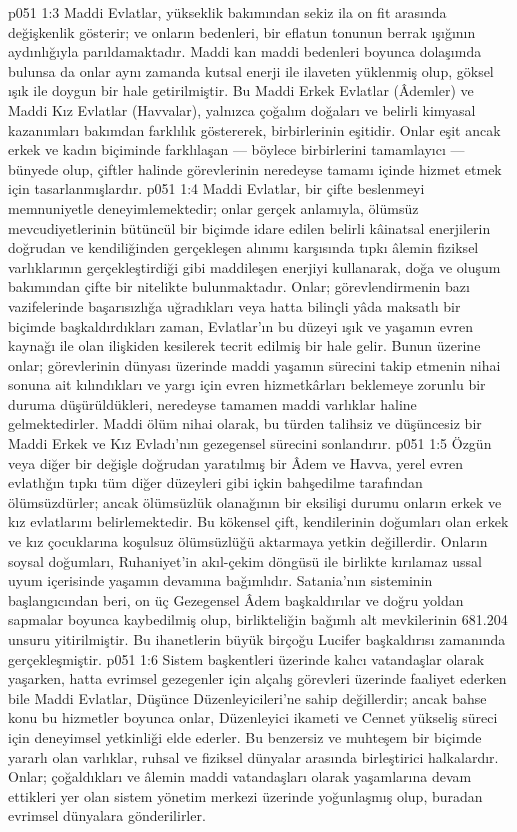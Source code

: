 \vs p051 1:3 Maddi Evlatlar, yükseklik bakımından sekiz ila on fit arasında değişkenlik gösterir; ve onların bedenleri, bir eflatun tonunun berrak ışığının aydınlığıyla parıldamaktadır. Maddi kan maddi bedenleri boyunca dolaşımda bulunsa da onlar aynı zamanda kutsal enerji ile ilaveten yüklenmiş olup, göksel ışık ile doygun bir hale getirilmiştir. Bu Maddi Erkek Evlatlar (Âdemler) ve Maddi Kız Evlatlar (Havvalar), yalnızca çoğalım doğaları ve belirli kimyasal kazanımları bakımdan farklılık göstererek, birbirlerinin eşitidir. Onlar eşit ancak erkek ve kadın biçiminde farklılaşan --- böylece birbirlerini tamamlayıcı --- bünyede olup, çiftler halinde görevlerinin neredeyse tamamı içinde hizmet etmek için tasarlanmışlardır.
\vs p051 1:4 Maddi Evlatlar, bir çifte beslenmeyi memnuniyetle deneyimlemektedir; onlar gerçek anlamıyla, ölümsüz mevcudiyetlerinin bütüncül bir biçimde idare edilen belirli kâinatsal enerjilerin doğrudan ve kendiliğinden gerçekleşen alınımı karşısında tıpkı âlemin fiziksel varlıklarının gerçekleştirdiği gibi maddileşen enerjiyi kullanarak, doğa ve oluşum bakımından çifte bir nitelikte bulunmaktadır. Onlar; görevlendirmenin bazı vazifelerinde başarısızlığa uğradıkları veya hatta bilinçli yâda maksatlı bir biçimde başkaldırdıkları zaman, Evlatlar’ın bu düzeyi ışık ve yaşamın evren kaynağı ile olan ilişkiden kesilerek tecrit edilmiş bir hale gelir. Bunun üzerine onlar; görevlerinin dünyası üzerinde maddi yaşamın sürecini takip etmenin nihai sonuna ait kılındıkları ve yargı için evren hizmetkârları beklemeye zorunlu bir duruma düşürüldükleri, neredeyse tamamen maddi varlıklar haline gelmektedirler. Maddi ölüm nihai olarak, bu türden talihsiz ve düşüncesiz bir Maddi Erkek ve Kız Evladı’nın gezegensel sürecini sonlandırır.
\vs p051 1:5 Özgün veya diğer bir değişle doğrudan yaratılmış bir Âdem ve Havva, yerel evren evlatlığın tıpkı tüm diğer düzeyleri gibi içkin bahşedilme tarafından ölümsüzdürler; ancak ölümsüzlük olanağının bir eksilişi durumu onların erkek ve kız evlatlarını belirlemektedir. Bu kökensel çift, kendilerinin doğumları olan erkek ve kız çocuklarına koşulsuz ölümsüzlüğü aktarmaya yetkin değillerdir. Onların soysal doğumları, Ruhaniyet’in akıl\hyp{}çekim döngüsü ile birlikte kırılamaz ussal uyum içerisinde yaşamın devamına bağımlıdır. Satania’nın sisteminin başlangıcından beri, on üç Gezegensel Âdem başkaldırılar ve doğru yoldan sapmalar boyunca kaybedilmiş olup, birlikteliğin bağımlı alt mevkilerinin 681.204 unsuru yitirilmiştir. Bu ihanetlerin büyük birçoğu Lucifer başkaldırısı zamanında gerçekleşmiştir.
\vs p051 1:6 Sistem başkentleri üzerinde kalıcı vatandaşlar olarak yaşarken, hatta evrimsel gezegenler için alçalış görevleri üzerinde faaliyet ederken bile Maddi Evlatlar, Düşünce Düzenleyicileri’ne sahip değillerdir; ancak bahse konu bu hizmetler boyunca onlar, Düzenleyici ikameti ve Cennet yükseliş süreci için deneyimsel yetkinliği elde ederler. Bu benzersiz ve muhteşem bir biçimde yararlı olan varlıklar, ruhsal ve fiziksel dünyalar arasında birleştirici halkalardır. Onlar; çoğaldıkları ve âlemin maddi vatandaşları olarak yaşamlarına devam ettikleri yer olan sistem yönetim merkezi üzerinde yoğunlaşmış olup, buradan evrimsel dünyalara gönderilirler.
